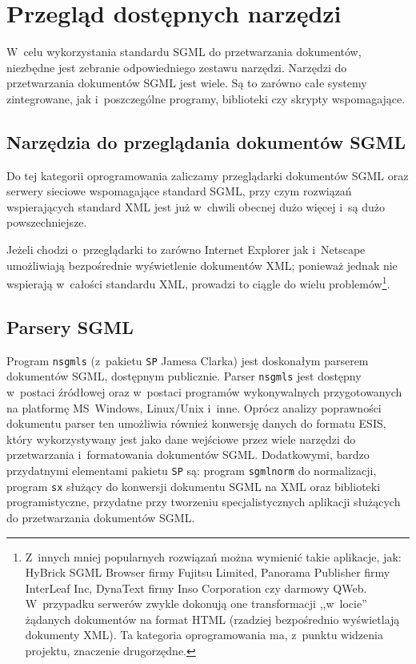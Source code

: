 \documentclass[document]{xmgr}
\begin{document}
\chapter{Przegląd dostępnych narzędzi\label{PRZEGLAD.NARZEDZI}}

W~celu wykorzystania standardu SGML do przetwarzania dokumentów,
niezbędne jest zebranie odpowiedniego zestawu narzędzi. Narzędzi do
przetwarzania dokumentów SGML jest wiele. Są to zarówno całe
systemy zintegrowane, jak i~poszczególne programy, biblioteki czy
skrypty wspomagające.

\section{Narzędzia do przeglądania dokumentów SGML}

Do tej kategorii oprogramowania zaliczamy przeglądarki dokumentów
SGML oraz serwery sieciowe wspomagające standard SGML, przy
czym rozwiązań wspierających standard XML jest już w~chwili obecnej
dużo więcej i~są dużo powszechniejsze.

Jeżeli chodzi o~przeglądarki to zarówno Internet Explorer jak
i~Netscape umożliwiają bezpośrednie wyświetlenie dokumentów XML;
ponieważ jednak nie wspierają w~całości standardu XML, prowadzi to
ciągle do wielu problemów\footnote{Z~innych mniej popularnych
  rozwiązań można wymienić takie aplikacje, jak: HyBrick SGML
  Browser firmy Fujitsu Limited, Panorama Publisher firmy InterLeaf
  Inc, DynaText firmy Inso Corporation czy darmowy QWeb. W~przypadku
  serwerów zwykle dokonują one transformacji ,,w~locie'' żądanych
  dokumentów na format HTML (rzadziej bezpośrednio wyświetlają
  dokumenty XML).  Ta kategoria oprogramowania ma, z~punktu widzenia
  projektu, znaczenie drugorzędne.}.

\section{Parsery SGML}
Program \texttt{nsgmls} (z~pakietu \texttt{SP} Jamesa Clarka) jest
doskonałym parserem dokumentów SGML, dostępnym
publicznie.  Parser \texttt{nsgmls} jest dostępny w~postaci źródłowej
oraz w~postaci programów wykonywalnych przygotowanych na platformę
MS~Windows, Linux/Unix i~inne. Oprócz analizy poprawności dokumentu
parser ten umożliwia również konwersję danych do formatu
ESIS, który wykorzystywany jest jako dane wejściowe przez
wiele narzędzi do przetwarzania i~formatowania dokumentów SGML.
Dodatkowymi, bardzo przydatnymi elementami pakietu \texttt{SP} są:
program \texttt{sgmlnorm} do normalizacji, program \texttt{sx} służący
do konwersji dokumentu SGML na XML oraz biblioteki programistyczne,
przydatne przy tworzeniu specjalistycznych aplikacji służących do
przetwarzania dokumentów SGML.
\end{document}
